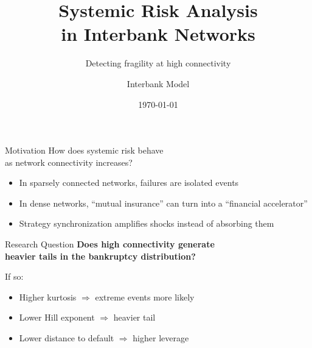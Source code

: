 \documentclass[11pt]{beamer}
\title[Systemic Risk Experiment]{Systemic Risk Analysis\\in Interbank Networks}
\subtitle{Detecting fragility at high connectivity}
\author{Interbank Model}
\institute{Interbank Simulation Framework}
\date{\today}
\begin{document}
\begin{frame}
\titlepage
\end{frame}

\begin{frame}{Motivation}
\centering
\Large
How does systemic risk behave\\as network connectivity increases?

\vspace{1em}
\normalsize
\begin{itemize}
    \item In sparsely connected networks, failures are isolated events
    \item In dense networks, ``mutual insurance'' can turn into a ``financial accelerator''
    \item Strategy synchronization amplifies shocks instead of absorbing them
\end{itemize}
\end{frame}

\begin{frame}{Research Question}
\centering
\Large
\textbf{Does high connectivity generate\\heavier tails in the bankruptcy distribution?}

\vspace{1.5em}
\normalsize
\noindent
If so:
\begin{itemize}
    \item Higher kurtosis $\Rightarrow$ extreme events more likely
    \item Lower Hill exponent $\Rightarrow$ heavier tail
    \item Lower distance to default $\Rightarrow$ higher leverage
\end{itemize}
\end{frame}
\end{document}
